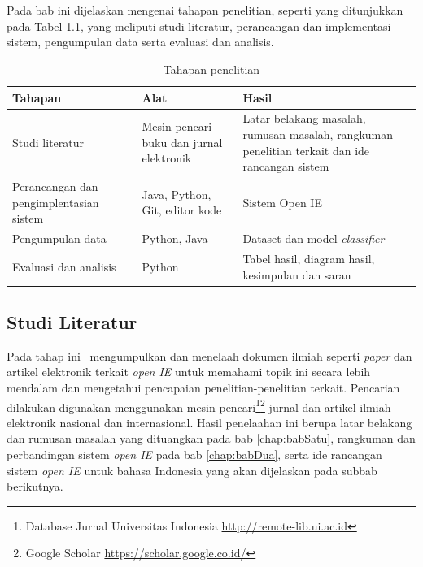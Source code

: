 \chapter{\babTiga}
\label{chap:babTiga}

Pada bab ini dijelaskan mengenai tahapan penelitian, seperti yang ditunjukkan pada Tabel \ref{tab:tahapan_penelitian}, yang meliputi studi literatur, perancangan dan implementasi sistem, pengumpulan data serta evaluasi dan analisis.

\begin{table}
\centering
\caption{Tahapan penelitian}
\label{tab:tahapan_penelitian}
\begin{tabular}{p{3.5cm} p{4.5cm} p{4.5cm}}
\hline
\textbf{Tahapan} & \textbf{Alat} & \textbf{Hasil} \\
\hline
Studi literatur & Mesin pencari buku dan jurnal elektronik & Latar belakang masalah, rumusan masalah, rangkuman penelitian terkait dan ide rancangan sistem \\
\hline
Perancangan dan pengimplentasian sistem & Java, Python, Git, editor kode & Sistem Open IE \\
\hline
Pengumpulan data & Python, Java & Dataset dan model \textit{classifier} \\
\hline
Evaluasi dan analisis & Python & Tabel hasil, diagram hasil, kesimpulan dan saran \\
\hline
\end{tabular}
\end{table}

\section{Studi Literatur}

Pada tahap ini \saya~mengumpulkan dan menelaah dokumen ilmiah seperti \textit{paper} dan artikel elektronik terkait \textit{open IE} untuk memahami topik ini secara lebih mendalam dan mengetahui pencapaian penelitian-penelitian terkait. Pencarian dilakukan digunakan menggunakan mesin pencari\footnote{Database Jurnal Universitas Indonesia \url{http://remote-lib.ui.ac.id}}\footnote{Google Scholar \url{https://scholar.google.co.id/}} jurnal dan artikel ilmiah elektronik nasional dan internasional. Hasil penelaahan ini berupa latar belakang dan rumusan masalah yang dituangkan pada bab \ref{chap:babSatu}, rangkuman dan perbandingan sistem \textit{open IE} pada bab \ref{chap:babDua}, serta ide rancangan sistem \textit{open IE} untuk bahasa Indonesia yang akan dijelaskan pada subbab berikutnya.

